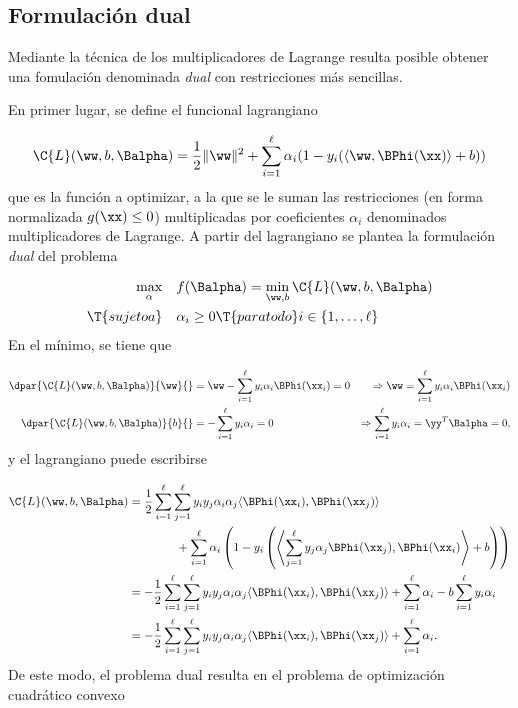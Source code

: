 \subsection{Formulación dual}
  Mediante la
técnica de los multiplicadores de Lagrange \cite{LAGRANGE}
\cite{bottou} resulta posible obtener una fomulación denominada
\emph{dual} con restricciones más sencillas.

En primer lugar, se define el funcional lagrangiano

\begin{align}
  \C{L}(\ww,b,\Balpha) = \frac{1}{2} \|\ww\|^2
  + \sum_{i=1}^{\ell} \alpha_i (1-y_i(\langle\ww,\BPhi(\xx)\rangle+b))
  \label{LP}
\end{align}
que es la función a optimizar, a la que se le suman las restricciones
(en forma normalizada $g(\xx)\leq0$) multiplicadas por coeficientes
$\alpha_i$ denominados multiplicadores de Lagrange.
A partir del lagrangiano se plantea la formulación \emph{dual}
del problema

\begin{align}
  \begin{split}
    \max_\alpha &\quad f(\Balpha) = \min_{\ww,b} \C{L}(\ww,b,\Balpha)\\
    \T{sujeto a} &\quad \alpha_i \geq 0\T{ para todo } i\in\{1,\ldots,\ell\}
  \end{split}
\end{align}
En el mínimo, se tiene que

\begin{align}
  \dpar{\C{L}(\ww,b,\Balpha)}{\ww}{}
    &=\ww-\sum_{i=1}^\ell y_i\alpha_i\BPhi(\xx_i) = 0
    &\Rightarrow \ww = \sum_{i=1}^\ell y_i\alpha_i\BPhi(\xx_i)
  \label{dobleve}\\
  \dpar{\C{L}(\ww,b,\Balpha)}{b}{}
    &=-\sum_{i=1}^\ell y_i\alpha_i = 0
      &\Rightarrow \sum_{i=1}^\ell y_i\alpha_i = \yy^T\Balpha = 0,
\end{align}
y el lagrangiano puede escribirse

\begin{align*}
  \C{L}(\ww,b,\Balpha)
  & = 
    \frac{1}{2}\sum_{i=1}^\ell\sum_{j=1}^\ell y_iy_j\alpha_i\alpha_j
    \langle\BPhi(\xx_i),\BPhi(\xx_j)\rangle \\
    &\qquad\qquad +
    \sum_{i=1}^{\ell} \alpha_i \left(1-y_i\left(\left\langle
    \sum_{j=1}^\ell y_j\alpha_j\BPhi(\xx_j) ,\BPhi(\xx_i)\right\rangle
    +b\right)\right)\\
  & = 
    -\frac{1}{2}\sum_{i=1}^\ell\sum_{j=1}^\ell y_iy_j\alpha_i\alpha_j
    \langle\BPhi(\xx_i),\BPhi(\xx_j)\rangle +
    \sum_{i=1}^{\ell} \alpha_i  - b \sum_{i=1}^\ell y_i\alpha_i \\
 & = 
    -\frac{1}{2}\sum_{i=1}^\ell\sum_{j=1}^\ell y_iy_j\alpha_i\alpha_j
    \langle\BPhi(\xx_i),\BPhi(\xx_j)\rangle +
    \sum_{i=1}^{\ell} \alpha_i  .
\end{align*}
De este modo, el problema dual resulta en el problema de optimización
cuadrático convexo

